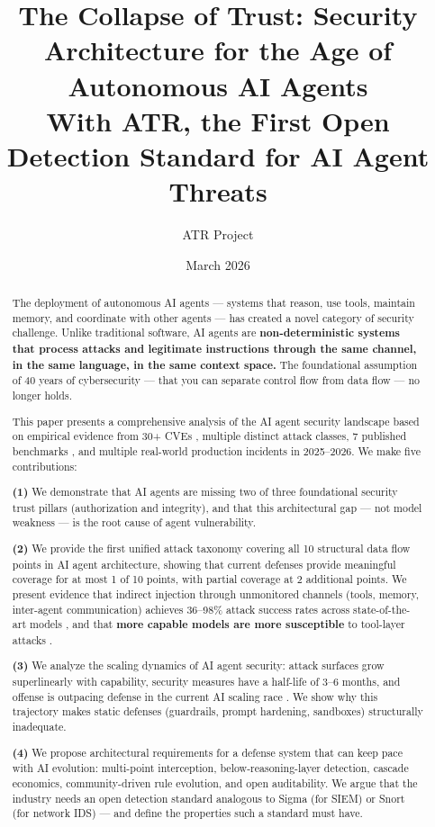 \documentclass[11pt,letterpaper]{article}
\title{The Collapse of Trust: Security Architecture for the Age of Autonomous AI Agents\\[0.5em]
\large With ATR, the First Open Detection Standard for AI Agent Threats}
\author{ATR Project}
\date{March 2026}
\begin{document}
\maketitle

\begin{abstract}
The deployment of autonomous AI agents --- systems that reason, use tools, maintain memory, and coordinate with other agents --- has created a novel category of security challenge. Unlike traditional software, AI agents are \textbf{non-deterministic systems that process attacks and legitimate instructions through the same channel, in the same language, in the same context space.} The foundational assumption of 40 years of cybersecurity --- that you can separate control flow from data flow --- no longer holds.

This paper presents a comprehensive analysis of the AI agent security landscape based on empirical evidence from 30+ CVEs \cite{cve6514,cve53773,cvegit,cve49596,cve59536,postmark,sandworm}, multiple distinct attack classes, 7 published benchmarks \cite{pint,mcptox,asb,aishell,hacka,tensortrust,caibench}, and multiple real-world production incidents in 2025--2026. We make five contributions:

\textbf{(1)} We demonstrate that AI agents are missing two of three foundational security trust pillars (authorization and integrity), and that this architectural gap --- not model weakness --- is the root cause of agent vulnerability.

\textbf{(2)} We provide the first unified attack taxonomy covering all 10 structural data flow points in AI agent architecture, showing that current defenses provide meaningful coverage for at most 1 of 10 points, with partial coverage at 2 additional points. We present evidence that indirect injection through unmonitored channels (tools, memory, inter-agent communication) achieves 36--98\% attack success rates across state-of-the-art models \cite{mcptox,minja,asb}, and that \textbf{more capable models are more susceptible} to tool-layer attacks \cite{mcptoxbench}.

\textbf{(3)} We analyze the scaling dynamics of AI agent security: attack surfaces grow superlinearly with capability, security measures have a half-life of 3--6 months, and offense is outpacing defense in the current AI scaling race \cite{aisafety}. We show why this trajectory makes static defenses (guardrails, prompt hardening, sandboxes) structurally inadequate.

\textbf{(4)} We propose architectural requirements for a defense system that can keep pace with AI evolution: multi-point interception, below-reasoning-layer detection, cascade economics, community-driven rule evolution, and open auditability. We argue that the industry needs an open detection standard analogous to Sigma \cite{sigma} (for SIEM) or Snort (for network IDS) --- and define the properties such a standard must have.


\end{abstract}
\end{document}
